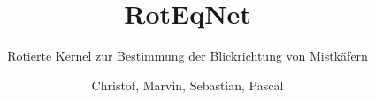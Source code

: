 \documentclass{beamer}
\author{Christof, Marvin, Sebastian, Pascal}
\title{RotEqNet}
\subtitle{Rotierte Kernel zur Bestimmung der Blickrichtung von Mistkäfern}
\begin{document}
%



\begin{frame}[plain]
  \maketitle
\end{frame}





\end{document}
